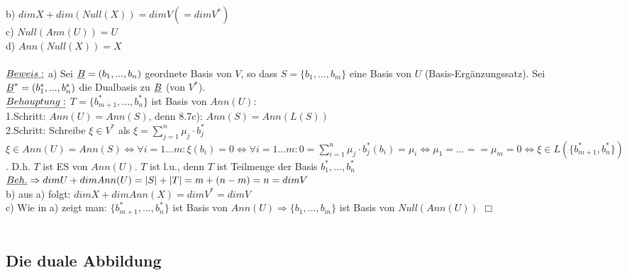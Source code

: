 \documentclass[fleqn, a4paper, 11pt]{article}
\begin{document}
b) $dim X+dim(Null(X))=dim V(=dim V^{\ast})$\\
c) $Null(Ann(U))=U$\\
d) $Ann(Null(X))=X$\\
\\
$\uline{Beweis:}$ a) Sei $\uline{B}=(b_1,...,b_n)$ geordnete Basis von $V$, so dass $S=\{b_1,...,b_m\}$ eine Basis von $U$ (Basis-Erg\"anzungssatz). Sei $\uline{B}^{\ast}=(b_1^{\ast},...,b_n^{\ast})$ die Dualbasis zu $\uline{B}$ (von $V^{\ast}$).\\
$\uline{Behauptung:}$ $T=\{b_{m+1}^{\ast},...,b_n^{\ast}\}$ ist Basis von $Ann(U)$:\\
1.Schritt: $Ann(U)=Ann(S)$, denn 8.7c): $Ann(S)=Ann(L(S))$\\
2.Schritt: Schreibe $\xi\in V^{\ast}$ als $\xi=\sum\limits_{j=1}^n \mu_j\cdot b_j^{\ast}$\\
$\xi\in Ann(U)=Ann(S)\Leftrightarrow \forall i=1...m:\xi(b_i)=0\Leftrightarrow \forall i=1...m:0=\sum\limits_{i=1}^n \mu_j\cdot b_j^{\ast}(b_i)=\mu_i\Leftrightarrow \mu_1=\dots==\mu_m=0\Leftrightarrow \xi\in L(\{b_{m+1}^{\ast},b_n^{\ast}\})$. D.h. $T$ ist ES von $Ann(U)$. $T$ ist l.u., denn $T$ ist Teilmenge der Basis $b_1^{\ast},...,b_n^{\ast}$\\
$\uline{Beh.}\Rightarrow dim U+dim Ann(U)=|S|+|T|=m+(n-m)=n=dim V$\\
b) aus a) folgt: $dim X+dim Ann(X)=dim V^{\ast}=dim V$\\
c) Wie in a) zeigt man: $\{b_{m+1}^{\ast},...,b_n^{\ast}\}$ ist Basis von $Ann(U)\Rightarrow\{b_1,...,b_m\}$ ist Basis von $Null(Ann(U))$ \hfill $\Box$\\
\\
\subsection{Die duale Abbildung}
\end{document}
